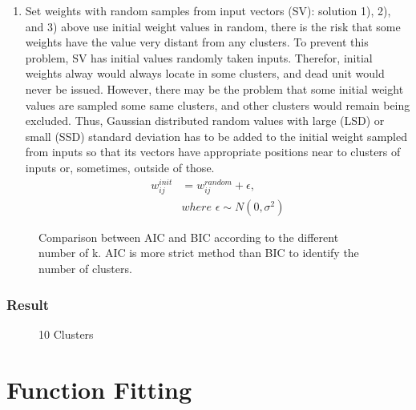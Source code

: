 \documentclass[12pt,a4paper]{report}
\begin{document}
\begin{enumerate}
\item Set weights with random samples from input vectors (SV): solution 1), 2), and 3) above use initial weight values in random, there is the risk that some weights have the value very distant from any clusters. To prevent this problem, SV has initial values randomly taken inputs. Therefor, initial weights alway would always locate in some clusters, and dead unit would never be issued. However, there may be the problem that some initial weight values are sampled some same clusters, and other clusters would remain being excluded. Thus, Gaussian distributed random values with large (LSD) or small (SSD) standard deviation has to be added to the initial weight sampled from inputs so that its vectors have appropriate positions near to clusters of inputs or, sometimes, outside of those.
\begin{equation} \label{eq9}
\begin{split}
w_{ij}^{init} & = w_{ij}^{random} + \epsilon, \\
& where \,\, \epsilon \sim N(0, \sigma^2)
\end{split}
\end{equation}
\end{enumerate}

\begin{figure}[thpb]\label{fig:states}
	\centering
	\caption{Comparison between AIC and BIC according to the different number of k. AIC is more strict method than BIC to identify the number of clusters.}
\end{figure}


\newpage
\subsection{Result}

\begin{figure}[thpb] \label{fig:cluster_10}
	\centering
	\caption{10 Clusters}
\end{figure}

\chapter{Function Fitting}
\end{document}
